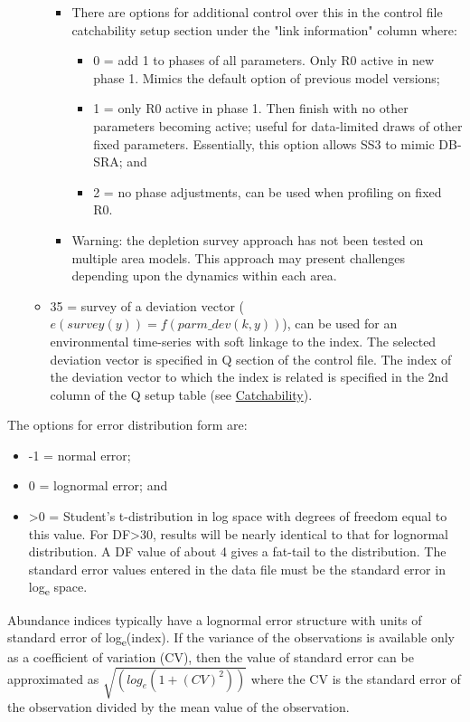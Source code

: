 \begin{itemize}
\begin{itemize}
\begin{itemize}
				\item There are options for additional control over this in the control file catchability setup section under the "link information" column where:
				\begin{itemize}
				    \item 0 = add 1 to phases of all parameters. Only R0 active in new phase 1. Mimics the default option of previous model versions;
				    \item 1 = only R0 active in phase 1. Then finish with no other parameters becoming active; useful for data-limited draws of other fixed parameters.  Essentially, this option allows SS3 to mimic DB-SRA; and
				    \item 2 = no phase adjustments, can be used when profiling on fixed R0.
				\end{itemize}
				\item Warning: the depletion survey approach has not been tested on multiple area models.  This approach may present challenges depending upon the dynamics within each area.
			\end{itemize}
			\item 35 = survey of a deviation vector ($e(survey(y)) = f(parm\_dev(k,y))$), can be used for an environmental time-series with soft linkage to the index. The selected deviation vector is specified in Q section of the control file. The index of the deviation vector to which the index is related is specified in the 2nd column of the Q setup table (see \hyperlink{Qsetup}{Catchability}).
		\end{itemize}
	\end{itemize}

The options for error distribution form are:
	\begin{itemize}
		\item -1 = normal error;
		\item  0 = lognormal error; and 
		\item >0 = Student's t-distribution in log space with degrees of freedom equal to this value.  For DF>30, results will be nearly identical to that for lognormal distribution.  A DF value of about 4 gives a fat-tail to the distribution.  The standard error values entered in the data file must be the standard error in log\textsubscript{e} space.
	\end{itemize}

Abundance indices typically have a lognormal error structure with units of standard error of log\textsubscript{e}(index).  If the variance of the observations is available only as a coefficient of variation (CV), then the value of standard error can be approximated as $\sqrt{(log_e(1+(CV)^2))}$ where the CV is the standard error of the observation divided by the mean value of the observation.

